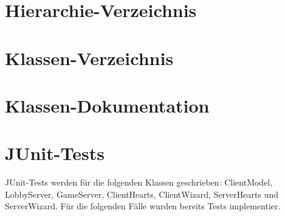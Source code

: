 \documentclass[twoside]{article}
\begin{document}
\section{Hierarchie-\/\-Verzeichnis}

\section{Klassen-\/\-Verzeichnis}

\section{Klassen-\/\-Dokumentation}














































































\section{JUnit-Tests}
JUnit-Tests werden für die folgenden Klassen geschrieben: ClientModel, LobbyServer,
GameServer, ClientHearts, ClientWizard, ServerHearts und ServerWizard. Für die folgenden Fälle wurden bereits Tests implementier.
\end{document}
